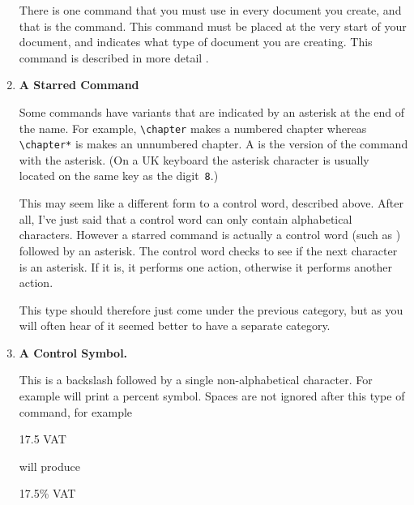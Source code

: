 \begin{enumerate}
There is one command that you must use in every document you create,
and that is the  command.  This command
must be placed at the very start of your document, and indicates what
type of document you are creating.  This command is described in more detail
.

\item \label{itm:starredcommand}\textbf{A Starred Command}

Some commands have variants that are indicated by an asterisk at the
end of the name. For example, \verb|\chapter| makes a numbered
chapter whereas \verb|\chapter*| is makes an unnumbered chapter.
A  is the version of the command with the
asterisk. (On a UK keyboard the asterisk character is usually
located on the same key as the digit~\texttt{8}.)

This may seem like a different form to a control word, described
above. After all, I've just said that a control word can only
contain alphabetical characters. However a starred command is actually a control
word (such as ) followed by an asterisk. The
control word checks to see if the next character is
an asterisk. If it is, it performs one action, otherwise it performs
another action.

This type should therefore just come under the previous category,
but as you will often hear of  it seemed better
to have a separate category. 

\item \label{itm:controlsymbol}\textbf{A Control Symbol.}

This is a backslash followed by a single non-alphabetical character.
For example  will print a percent symbol.
Spaces are
not ignored after this type of command, for example
\begin{codeS}
17.5 VAT
\end{codeS}%
will produce
\begin{resultS}
17.5\% VAT
\end{resultS}


\end{enumerate}
